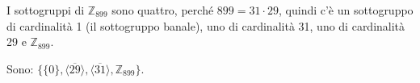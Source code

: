 \documentclass[../main.tex]{subfiles}
\begin{document}
\begin{example}
    I sottogruppi di $\mathbb{Z}_{899}$ sono quattro, perché $899 = 31 \cdot 29$, quindi c'è un sottogruppo di
    cardinalità 1 (il sottogruppo banale), uno di cardinalità 31, uno di cardinalità 29 e $\mathbb{Z}_{899}$.

    Sono: $\{\{0\} , \langle \overline{29} \rangle , \langle \overline{31} \rangle , \mathbb{Z}_{899}\}$.
\end{example}
\end{document}
